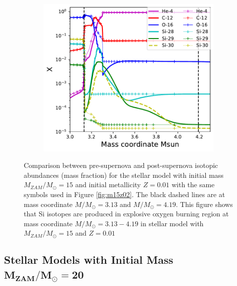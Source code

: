 \documentclass{brandeis-thesis3.2}
\def \msun {M_{\odot}}
\begin{document}
\begin{figure}[H]
    \centering
    \begin{subfigure}[c]{0.6\textwidth}
        \includegraphics[width=\textwidth]{figs/150.01.pdf}
    \end{subfigure}
    \caption{Comparison between pre-supernova and post-supernova isotopic abundances (mass fraction) for the stellar model with initial mass $M_{ZAM}/\msun =15$ and initial metallicity $Z=0.01$ with the same symbols used in Figure \ref{fig:m15z02}. The black dashed lines are at mass coordinate $M/\msun = 3.13$ and $M/\msun = 4.19$. This figure shows that Si isotopes are produced in explosive oxygen burning region at mass coordinate $M/\msun = 3.13-4.19$ in stellar model with $M_{ZAM}/\msun =15$ and $Z=0.01$}
    \label{fig:m15z01}
\end{figure}



\subsection[Stellar Models with Initial Mass $M_{ZAM}/\msun = 20$]{Stellar Models with Initial Mass $\mathbf{M_{ZAM}/\msun = 20}$}
\end{document}

